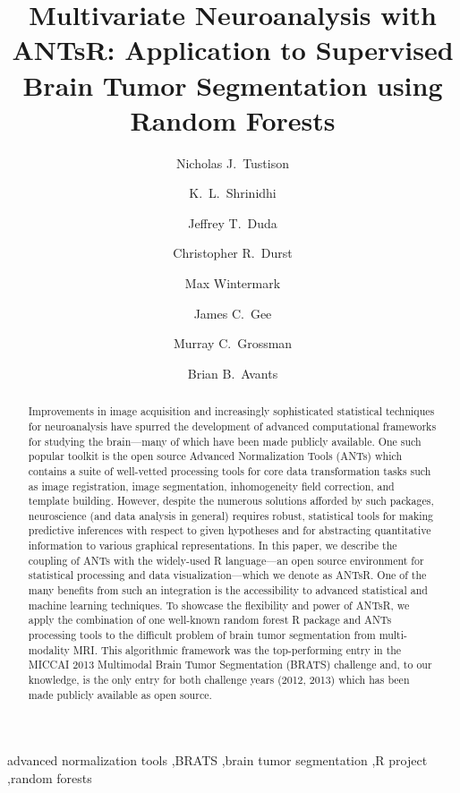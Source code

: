\documentclass[final,5p,times,twocolumn]{elsarticle}
\begin{document}
\begin{frontmatter}

\title{Multivariate Neuroanalysis with ANTsR: Application to Supervised Brain Tumor Segmentation using Random Forests}

\author[label1]{Nicholas J.~Tustison
  }
\author[label2]{K.~L.~Shrinidhi}
\author[label2]{Jeffrey T.~Duda}
\author[label1]{Christopher R.~Durst}
\author[label1]{Max Wintermark}
\author[label1]{James C.~Gee}
\author[label1]{Murray C.~Grossman}
\author[label2]{Brian B.~Avants}
\address[label1]{Department of Radiology and Medical Imaging, University of Virginia, Charlottesville, VA}
\address[label2]{Penn Image Computing and Science Laboratory, University of Pennsylvania,
                Philadelphia, PA}


\linenumbers

\begin{abstract} 
Improvements in image acquisition and increasingly sophisticated statistical techniques 
for neuroanalysis have spurred the development of advanced computational frameworks for studying the
brain---many of which
have been made publicly available.  One such popular toolkit is the open source Advanced
Normalization Tools (ANTs) which contains a suite of well-vetted processing tools for
core data transformation tasks such as image registration, image segmentation, 
inhomogeneity field correction, and template building.  However, despite the numerous
solutions afforded by such packages, neuroscience (and data analysis in general) requires
robust, statistical tools for making predictive inferences with respect to given hypotheses
and for abstracting quantitative information to various graphical representations.  
In this paper, we describe the
coupling of ANTs with the widely-used R language---an open source environment for 
statistical processing and data visualization---which we denote as ANTsR.  One of the
many benefits from such an integration is the accessibility to advanced statistical 
and machine learning techniques.  To showcase the flexibility and power of ANTsR, we 
apply the combination of one well-known random forest R package  and ANTs processing 
tools to the difficult problem of brain tumor segmentation from multi-modality
MRI.  This algorithmic framework was the top-performing entry in the MICCAI 2013 Multimodal 
Brain Tumor Segmentation (BRATS) challenge and, to our knowledge, is the only entry for
both challenge years (2012, 2013) which has been made publicly available as open source.
\end{abstract}

\begin{keyword}
advanced normalization tools \sep BRATS \sep brain tumor segmentation \sep R project \sep random forests
\end{keyword}

\end{frontmatter}
\end{document}
